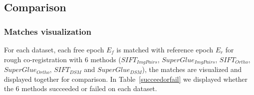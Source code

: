 \subsection{Comparison}

\subsubsection{Matches visualization}
For each dataset, each free epoch $E_f$ is matched with reference epoch $E_r$ for rough co-registration with 6 methods ($SIFT_{ImgPairs}$, $SuperGlue_{ImgPairs}$, $SIFT_{Ortho}$, $SuperGlue_{Ortho}$, $SIFT_{DSM}$ and $SuperGlue_{DSM}$), the matches are visualized and displayed together for comparison. In Table~\ref{succeedorfail} we displayed whether the 6 methods succeeded or failed on each dataset.\\
